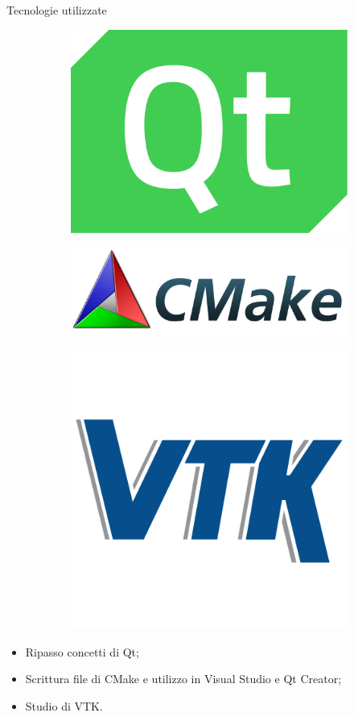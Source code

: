 \documentclass{beamer}
\begin{document}
\begin{frame}{Tecnologie utilizzate}
	\begin{figure}
		\centering
		\begin{subfigure}{.3\textwidth}
  			\centering
  			\includegraphics[width=.5\linewidth]{Images/logoqt.png}
		\end{subfigure}
		\begin{subfigure}{.3\textwidth}
  			\centering
  			\includegraphics[width=1\linewidth]{Images/logocmake.png}
		\end{subfigure}
		\begin{subfigure}{.3\textwidth}
  			\centering
  			\includegraphics[width=.6\linewidth]{Images/logovtk.png}
		\end{subfigure}
	\end{figure}	
	
	\begin{itemize}
		\item Ripasso concetti di Qt;
		\item Scrittura file di CMake e utilizzo in Visual Studio e Qt Creator;
		\item Studio di VTK.
	\end{itemize}
	
	\end{frame}
	
\end{document}
